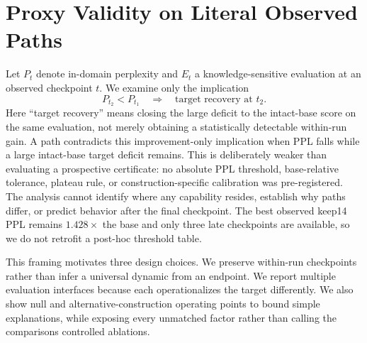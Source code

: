 \section{Proxy Validity on Literal Observed Paths}
\label{sec:observation}

Let $P_t$ denote in-domain perplexity and $E_t$ a knowledge-sensitive
evaluation at an observed checkpoint $t$. We examine only the implication
\[
P_{t_2}<P_{t_1}\quad\Longrightarrow\quad
\text{target recovery at }t_2 .
\]
Here ``target recovery'' means closing the large deficit to the intact-base
score on the same evaluation, not merely obtaining a statistically detectable
within-run gain. A path contradicts this improvement-only implication when PPL
falls while a large intact-base target deficit remains. This is deliberately
weaker than evaluating a prospective certificate: no absolute PPL threshold,
base-relative tolerance, plateau rule, or construction-specific calibration was
pre-registered. The analysis cannot identify where any capability resides,
establish why paths differ, or predict behavior after the final checkpoint.
The best observed keep14 PPL remains $1.428\times$ the base and only three late
checkpoints are available, so we do not retrofit a post-hoc threshold table.

This framing motivates three design choices. We preserve within-run checkpoints
rather than infer a universal dynamic from an endpoint. We report multiple
evaluation interfaces because each operationalizes the target differently. We
also show null and alternative-construction operating points to bound simple
explanations, while exposing every unmatched factor rather than calling the
comparisons controlled ablations.
